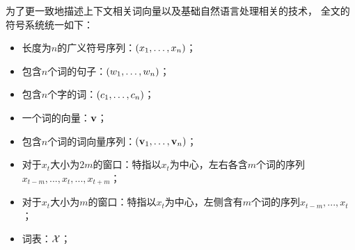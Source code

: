 \begin{denotation}

为了更一致地描述上下文相关词向量以及基础自然语言处理相关的技术，
全文的符号系统统一如下：

\begin{itemize}
\item 长度为$n$的广义符号序列：$\left(x_1, \dots, x_n\right)$；
\item 包含$n$个词的句子：$\left(w_1, \dots, w_n\right)$；
\item 包含$n$个字的词：$\left(c_1, \dots, c_n\right)$；
\item 一个词的向量：$\mathbf{v}$；
\item 包含$n$个词的词向量序列：$\left(\mathbf{v}_1, \dots, \mathbf{v}_n\right)$；
\item 对于$x_t$大小为$2m$的窗口：特指以$x_t$为中心，左右各含$m$个词的序列$x_{t-m}, ..., x_t, ..., x_{t+m}$；
\item 对于$x_t$大小为$m$的窗口：特指以$x_t$为中心，左侧含有$m$个词的序列$x_{t-m}, ..., x_t$；
\item 词表：$\mathcal{X}$；
\end{itemize}

\end{denotation}
